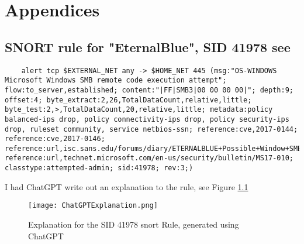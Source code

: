 \documentclass[
	letterpaper, %
	10pt, %
	unnumberedsections, %
	twoside, %
]{APAAssignment}
\begin{document}
\clearpage
\printbibliography %





\appendix


\clearpage
\chapter{Appendices}
\begin{appendices}
\section{SNORT rule for "EternalBlue", SID 41978 see\cite{SnortEternalBlue}}\label{app:SnortEternalBlue}

\begin{lstlisting}
	alert tcp $EXTERNAL_NET any -> $HOME_NET 445 (msg:"OS-WINDOWS Microsoft Windows SMB remote code execution attempt"; flow:to_server,established; content:"|FF|SMB3|00 00 00 00|"; depth:9; offset:4; byte_extract:2,26,TotalDataCount,relative,little; byte_test:2,>,TotalDataCount,20,relative,little; metadata:policy balanced-ips drop, policy connectivity-ips drop, policy security-ips drop, ruleset community, service netbios-ssn; reference:cve,2017-0144; reference:cve,2017-0146; reference:url,isc.sans.edu/forums/diary/ETERNALBLUE+Possible+Window+SMB+Buffer+Overflow+0Day/22304/; reference:url,technet.microsoft.com/en-us/security/bulletin/MS17-010; classtype:attempted-admin; sid:41978; rev:3;)
\end{lstlisting}

I had ChatGPT write out an explanation to the rule, see Figure \ref{fig:SnortExplain}

\begin{figure}[!htp] %
	\centering
	\texttt{[image: ChatGPTExplanation.png]}
	\caption{Explanation for the  SID 41978 snort Rule, generated using ChatGPT }
	\label{fig:SnortExplain}
\end{figure}





\end{appendices}
\end{document}

